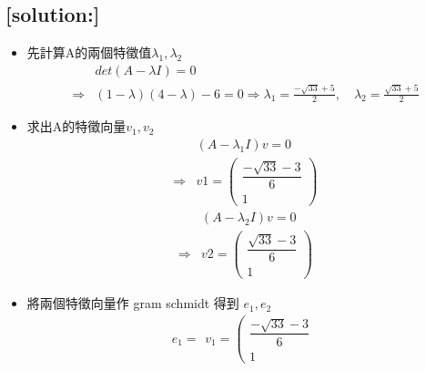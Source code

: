 \documentclass[12pt]{article}
\begin{document}
    \subsection*{[solution:]}
    \begin{itemize}
        \item 先計算A的兩個特徵值$\lambda_1, \lambda_2$
            \[
                \begin{aligned}
                        &det(A-\lambda I)=0\\
            \Rightarrow &(1-\lambda)(4-\lambda)-6 = 0
            \Rightarrow \lambda_1 = \frac{-\sqrt{33}+5}{2}, \quad \lambda_2 = \frac{\sqrt{33}+5}{2}
                \end{aligned}
            \]
        \item 求出A的特徵向量$v_1, v_2$
            \[  
                \begin{aligned}
                        &(A-\lambda_1 I)v=0\\
            \Rightarrow &v1 = \left(
                                \begin{array}{c}
                                    \dfrac{-\sqrt{33}-3}{6}\\
                                    1
                                \end{array}
                            \right)
                \end{aligned}
            \]
            \[
                \begin{aligned}
                    &(A-\lambda_2 I)v=0\\
            \Rightarrow &v2 = \left(
                            \begin{array}{c}
                                \dfrac{\sqrt{33}-3}{6}\\
                                1
                            \end{array}
                        \right)
                \end{aligned}
            \]
        \item 將兩個特徵向量作 gram schmidt 得到 $e_1, e_2$
            \[  
                e_1=
                \begin{aligned}
                    v_1=\left(
                        \begin{array}{c}
                            \dfrac{-\sqrt{33}-3}{6}\\
                            1
                        \end{array}

\end{aligned}\]
\end{itemize}
\end{document}
